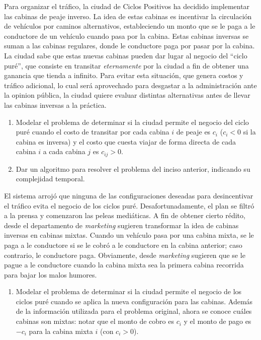 

 \item Para organizar el tráfico, la ciudad de Ciclos Positivos ha decidido implementar las cabinas de peaje inverso. La idea de estas cabinas es incentivar la circulación de vehículos por caminos alternativos, estableciendo un monto que se le paga a le conductore de un vehículo cuando pasa por la cabina. Estas cabinas inversas se suman a las cabinas regulares, donde le conductore paga por pasar por la cabina.  La ciudad sabe que estas nuevas cabinas pueden dar lugar al negocio del ``ciclo puré'', que consiste en transitar \emph{eternamente} por la ciudad a fin de obtener una ganancia que tienda a infinito.  Para evitar esta situación, que genera costos y tráfico adicional, lo cual será aprovechado para desgastar a la administración ante la opinion pública, la ciudad quiere evaluar distintas alternativas antes de llevar las cabinas inversas a la práctica.

 \begin{enumerate}[label=$\alph*$.,ref=$\alph*$]
  \item Modelar el problema de determinar si la ciudad permite el negocio del ciclo puré cuando el costo de transitar por cada cabina $i$ de peaje es $c_i$ ($c_i < 0$ si la cabina es inversa) y el costo que cuesta viajar de forma directa de cada cabina $i$ a cada cabina $j$ es $c_{ij} > 0$.
  \item Dar un algoritmo para resolver el problema del inciso anterior, indicando su complejidad temporal.
 \end{enumerate}

 El sistema arrojó que ninguna de las configuraciones deseadas para desincentivar el tráfico evita el negocio de los ciclos puré.  Desafortunadamente, el plan se filtró a la prensa y comenzaron las peleas mediáticas.  A fin de obtener cierto rédito, desde el departamento de \textit{marketing} sugieren transformar la idea de cabinas inversas en cabinas mixtas.  Cuando un vehículo pasa por una cabina mixta, se le paga a le conductore si se le cobró a le conductore en la cabina anterior; caso contrario, le conductore paga.  Obviamente, desde \textit{marketing} sugieren que se le pague a le conductore cuando la cabina mixta sea la primera cabina recorrida para bajar los malos humores.

 \begin{enumerate}[resume*]
  \item Modelar el problema de determinar si la ciudad permite el negocio de los ciclos puré cuando se aplica la nueva configuración para las cabinas.  Además de la información utilizada para el problema original, ahora se conoce cuáles cabinas son mixtas: notar que el monto de cobro es $c_i$ y el monto de pago es $-c_i$ para la cabina mixta $i$ (con $c_i > 0$).
 \end{enumerate}

